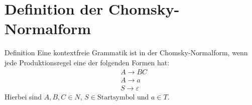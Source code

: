\documentclass[t]{beamer}
\begin{document}
	\section{Definition der Chomsky-Normalform}\label{sec:chomsky-normal-form-definition}
	\begin{frame}
		\begin{block}{Definition}
			Eine kontextfreie Grammatik ist in der Chomsky-Normalform, wenn jede Produktionsregel eine der folgenden Formen hat:
			\begin{align*}
				& A \rightarrow BC \\
				& A \rightarrow a \\
				& S \rightarrow \varepsilon
			\end{align*}
			Hierbei sind $A,B,C \in N$, $S \in \text{Startsymbol}$ und $a \in T$.
		\end{block}
	\end{frame}
\end{document}

